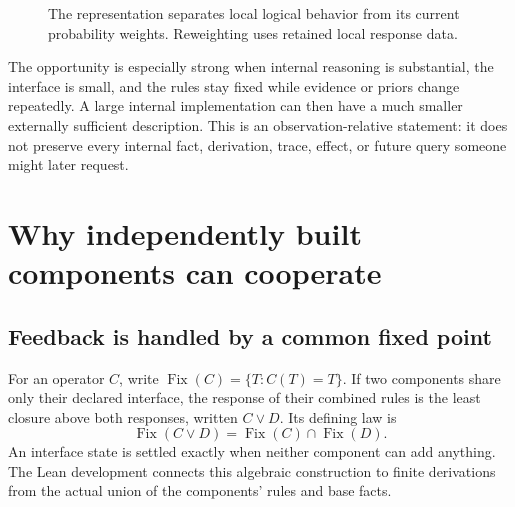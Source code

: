 \documentclass[11pt,a4paper]{article}
\newcommand{\Fix}{\operatorname{Fix}}
\begin{document}
\begin{figure}[ht]
\centering
{}
\caption{The representation separates local logical behavior from its current
probability weights. Reweighting uses retained local response data.}
\end{figure}

The opportunity is especially strong when internal reasoning is substantial,
the interface is small, and the rules stay fixed while evidence or priors
change repeatedly. A large internal implementation can then have a much
smaller externally sufficient description. This is an observation-relative
statement: it does not preserve every internal fact, derivation, trace,
effect, or future query someone might later request.

\section{Why independently built components can cooperate}

\subsection{Feedback is handled by a common fixed point}

For an operator $C$, write $\Fix(C)=\{T:C(T)=T\}$. If two components share
only their declared interface, the response of their combined rules is the
least closure above both responses, written $C\vee D$. Its defining law is
\[
 \Fix(C\vee D)=\Fix(C)\cap\Fix(D).
 \tag{1}
\]
An interface state is settled exactly when neither component can add anything.
The Lean development connects this algebraic construction to finite derivations
from the actual union of the components' rules and base facts.
\end{document}
